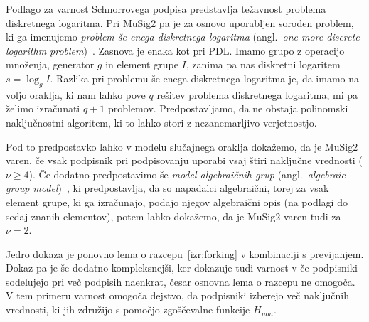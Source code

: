 Podlago za varnost Schnorrovega podpisa predstavlja težavnost problema diskretnega logaritma. Pri
MuSig2 pa je za osnovo uporabljen soroden problem, ki ga imenujemo \textit{problem še enega diskretnega logaritma}
(angl.\ \textit{one-more discrete logarithm problem})~\cite{bellare2003omdl}. Zasnova je enaka kot
pri PDL. Imamo grupo z operacijo množenja, generator $g$ in element grupe $I$, zanima pa nas diskretni
logaritem $s = \log_g I$. Razlika pri problemu še enega diskretnega logaritma je, da imamo na voljo
oraklja, ki nam lahko pove $q$ rešitev problema diskretnega logaritma, mi pa želimo izračunati $q + 1$
problemov. Predpostavljamo, da ne obstaja polinomski naključnostni algoritem, ki to lahko stori z
nezanemarljivo verjetnostjo.

Pod to predpostavko lahko v modelu slučajnega oraklja dokažemo, da je MuSig2 varen, če vsak podpisnik
pri podpisovanju uporabi vsaj štiri naključne vrednosti ($\nu \geq 4$). Če dodatno predpostavimo še
\textit{model algebraičnih grup} (angl.\ \textit{algebraic group model})~\cite{fuchsbauer2018agm},
ki predpostavlja, da so napadalci algebraični, torej za vsak element grupe, ki ga izračunajo, podajo
njegov algebraični opis (na podlagi do sedaj znanih elementov), potem lahko dokažemo, da je MuSig2
varen tudi za $\nu = 2$.

Jedro dokaza je ponovno lema o razcepu~\ref{izr:forking} v kombinaciji s previjanjem. Dokaz pa je še
dodatno kompleksnejši, ker dokazuje tudi varnost v če podpisniki sodelujejo pri več podpisih naenkrat,
česar osnovna lema o razcepu ne omogoča. V tem primeru varnost omogoča dejstvo, da podpisniki izberejo
več naključnih vrednosti, ki jih združijo s pomočjo zgoščevalne funkcije $H_{non}$.
